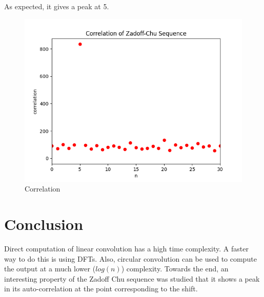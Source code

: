 \documentclass[11pt, a4paper]{article}
\begin{document}
As expected, it gives a peak at 5.
\begin{figure}[!tbh]
   	\centering
  \includegraphics[scale=0.5]{correlation.png} 
    \caption{Correlation} 	
   \end{figure}  
   
   
\section{Conclusion}
Direct computation of linear convolution has a high time complexity. A faster way to do this is using DFTs. Also, circular convolution can be used to compute the output at a much lower ($log(n)$) complexity. Towards the end, an interesting property of the Zadoff Chu sequence was studied that it shows a peak in its auto-correlation at the point corresponding to the shift.
\end{document}
